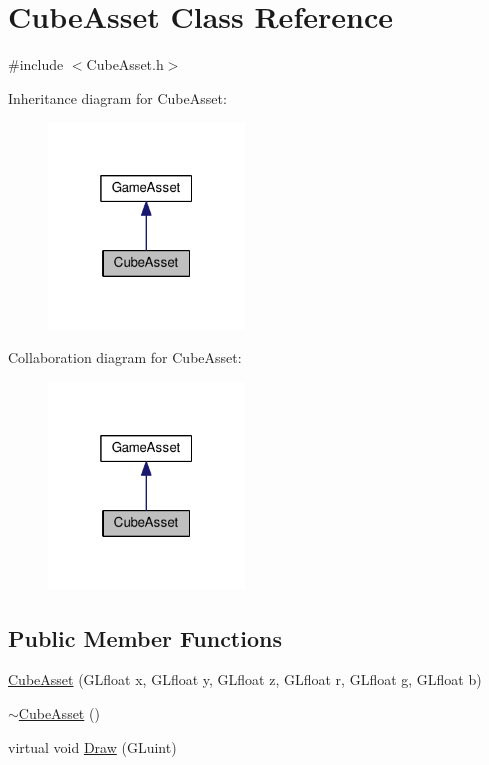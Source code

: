 \hypertarget{class_cube_asset}{}\section{Cube\+Asset Class Reference}
\label{class_cube_asset}


{\ttfamily \#include $<$Cube\+Asset.\+h$>$}



Inheritance diagram for Cube\+Asset\+:\nopagebreak
\begin{figure}[H]
\begin{center}
\leavevmode
\includegraphics[width=148pt]{class_cube_asset__inherit__graph}
\end{center}
\end{figure}


Collaboration diagram for Cube\+Asset\+:\nopagebreak
\begin{figure}[H]
\begin{center}
\leavevmode
\includegraphics[width=148pt]{class_cube_asset__coll__graph}
\end{center}
\end{figure}
\subsection*{Public Member Functions}
\begin{DoxyCompactItemize}
\item 
\hyperlink{class_cube_asset_a0cc99acd753a835e1d10be46cf8a0e5c}{Cube\+Asset} (G\+Lfloat x, G\+Lfloat y, G\+Lfloat z, G\+Lfloat r, G\+Lfloat g, G\+Lfloat b)
\item 
\hyperlink{class_cube_asset_ab3ab9a5da82cbf8537a28652410093b1}{$\sim$\+Cube\+Asset} ()
\item 
virtual void \hyperlink{class_cube_asset_a1af568486056e254ffcf98fd99947bfe}{Draw} (G\+Luint)
\end{DoxyCompactItemize}
